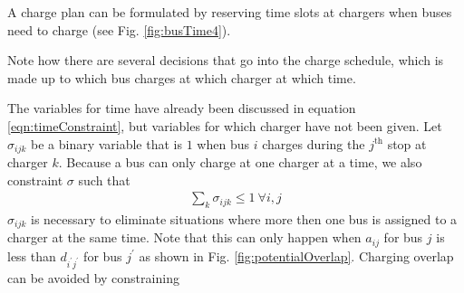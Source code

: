 \par A charge plan can be formulated by reserving time slots at chargers when buses need to charge (see Fig. \ref{fig:busTime4}).

	Note how there are several decisions that go into the charge schedule, which is made up to which bus charges at which charger at which time. 
	\par The variables for time have already been discussed in equation \ref{eqn:timeConstraint}, but variables for which charger have not been given.  Let $\sigma_{ijk}$ be a binary variable that is $1$ when bus $i$ charges during the $j^{\text{th}}$ stop at charger $k$. Because a bus can only charge at one charger at a time, we also constraint $\sigma$ such that
	\begin{equation}
		\begin{aligned}
			\sum_k \sigma_{ijk} \le 1 \ \forall i,j
		\end{aligned}
	\end{equation}
	$\sigma_{ijk}$ is necessary to eliminate situations where more then one bus is assigned to a charger at the same time. Note that this can only happen when $a_{ij}$ for bus $j$ is less than $d_{i^{'}j^{'}}$ for bus $j^{'}$ as shown in Fig. \ref{fig:potentialOverlap}. Charging overlap can be avoided by constraining
	
	
